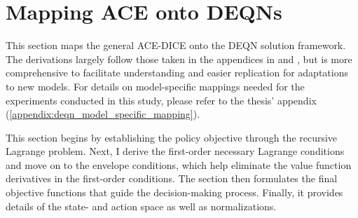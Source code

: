 \section{Mapping ACE onto DEQNs}
\label{sec:mapping_ace_onto_deqns}

This section maps the general ACE-DICE onto the DEQN solution framework. The derivations largely follow those taken in the appendices in \textcite{Folini2024ClimateInCE} and \textcite{friedl2023_deepUQ}, but is more comprehensive to facilitate understanding and easier replication for adaptations to new models. For details on model-specific mappings needed for the experiments conducted in this study, please refer to the thesis' appendix (\ref{appendix:deqn_model_specific_mapping}). 

This section begins by establishing the policy objective through the recursive Lagrange problem. Next, I derive the first-order necessary Lagrange conditions and move on to the envelope conditions, which help eliminate the value function derivatives in the first-order conditions. The section then formulates the final objective functions that guide the decision-making process. Finally, it provides details of the state- and action space as well as normalizations.






